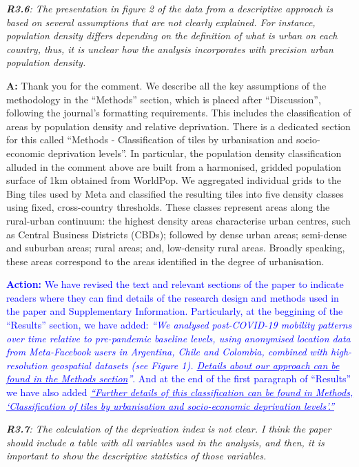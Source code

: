 \documentclass[12pt,a4paper,oneside, reqno]{amsart}
\begin{document}
\setlength{\leftskip}{0cm} \textit{\textbf{R3.6}: The presentation in figure 2 of the data from a descriptive approach is based on several assumptions that are not clearly explained. For instance, population density differs depending on the definition of what is urban on each country, thus, it is unclear how the analysis incorporates with precision urban population density.}

\setlength{\leftskip}{1cm}\textbf{A:} Thank you for the comment. We describe all the key assumptions of the methodology in the ``Methods'' section, which is placed after ``Discussion'', following the journal's formatting requirements. This includes the classification of areas by population density and relative deprivation. There is a dedicated section for this called ``Methods - Classification of tiles by urbanisation and socio-economic deprivation levels''. In particular, the population density classification alluded in the comment above are built from a harmonised, gridded population surface of 1km obtained from WorldPop. We aggregated individual grids to the Bing tiles used by Meta and classified the resulting tiles into five density classes using fixed, cross-country thresholds. These classes represent areas along the rural-urban continuum: the highest density areas characterise urban centres, such as Central Business Districts (CBDs); followed by dense urban areas; semi-dense and suburban areas; rural areas; and, low-density rural areas. Broadly speaking, these areas correspond to the areas identified in the degree of urbanisation.

\textcolor{blue}{
\textbf{Action:} We have revised the text and relevant sections of the paper to indicate readers where they can find details of the research design and methods used in the paper and Supplementary Information. Particularly, at the beggining of the ``Results'' section, we have added: \textit{``We analysed post-COVID-19 mobility patterns over time relative to pre-pandemic baseline levels, using anonymised location data from Meta-Facebook users in Argentina, Chile and Colombia, combined with high-resolution geospatial datasets (see Figure 1). \ul{Details about our approach can be found in the Methods section}''}. And at the end of the first paragraph of ``Results'' we have also added \textit{\uline{``Further details of this classification can be found in Methods, `Classification of tiles by urbanisation and socio-economic deprivation levels'.''}}
}

\setlength{\leftskip}{0cm} \textit{\textbf{R3.7}: The calculation of the deprivation index is not clear. I think the paper should include a table with all variables used in the analysis, and then, it is important to show the descriptive statistics of those variables.}
\end{document}
